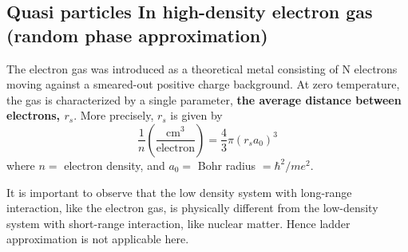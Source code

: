 \subsection{Quasi particles In high-density electron gas (random phase approximation)}
The electron gas was introduced as a theoretical metal consisting of N electrons moving against a smeared-out positive charge background. At zero temperature, the gas is characterized by a single parameter, \textbf{the average distance between electrons, $r_s$}. More precisely, $r_s$ is given by
\begin{equation}\frac{1}{n}\left(\frac{\mathrm{cm}^{3}}{\mathrm{electron}}\right)=\frac{4}{3} \pi\left(r_{s} a_{0}\right)^{3}\end{equation}
where $n=$ electron density, and $a_{0}=$ Bohr radius $=\hbar^{2} / m e^{2}$.

It is important to observe that the low density system with long-range interaction, like the electron gas, is physically different from the low-density system with short-range interaction, like nuclear matter. Hence ladder approximation is not applicable here.

